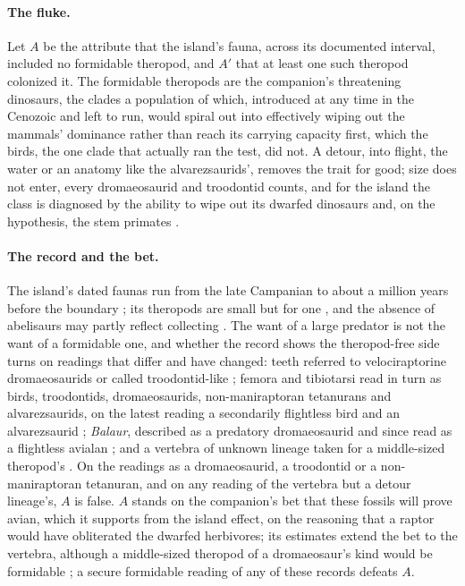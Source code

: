\documentclass[11pt]{article}
\theoremstyle{definition}
\begin{document}
\paragraph{The fluke.} Let $A$ be the attribute that the island's fauna, across its documented interval, included no formidable theropod, and $A'$ that at least one such theropod colonized it. The formidable theropods are the companion's threatening dinosaurs, the clades a population of which, introduced at any time in the Cenozoic and left to run, would spiral out into effectively wiping out the mammals' dominance rather than reach its carrying capacity first, which the birds, the one clade that actually ran the test, did not. A detour, into flight, the water or an anatomy like the alvarezsaurids', removes the trait for good; size does not enter, every dromaeosaurid and troodontid counts, and for the island the class is diagnosed by the ability to wipe out its dwarfed dinosaurs and, on the hypothesis, the stem primates \cite{Nexus}.

\paragraph{The record and the bet.} The island's dated faunas run from the late Campanian to about a million years before the boundary \cite{CsikiSava2016eastside}; its theropods are small but for one \cite{CsikiGrigorescu1998smalltheropods}, and the absence of abelisaurs may partly reflect collecting \cite{BENTON2010438}. The want of a large predator is not the want of a formidable one, and whether the record shows the theropod-free side turns on readings that differ and have changed: teeth referred to velociraptorine dromaeosaurids or called troodontid-like \cite{CsikiGrigorescu1998smalltheropods}; femora and tibiotarsi read in turn as birds, troodontids, dromaeosaurids, non-maniraptoran tetanurans and alvarezsaurids, on the latest reading a secondarily flightless bird and an alvarezsaurid \cite{Stoicescu2024Elopteryx}; \textit{Balaur}, described as a predatory dromaeosaurid \cite{Csiki2010} and since read as a flightless avialan \cite{Cau2015}; and a vertebra of unknown lineage taken for a middle-sized theropod's \cite{Smith2002Nalatvad}. On the readings as a dromaeosaurid, a troodontid or a non-maniraptoran tetanuran, and on any reading of the vertebra but a detour lineage's, $A$ is false. $A$ stands on the companion's bet that these fossils will prove avian, which it supports from the island effect, on the reasoning that a raptor would have obliterated the dwarfed herbivores; its estimates extend the bet to the vertebra, although a middle-sized theropod of a dromaeosaur's kind would be formidable \cite{Nexus}; a secure formidable reading of any of these records defeats $A$.
\end{document}
